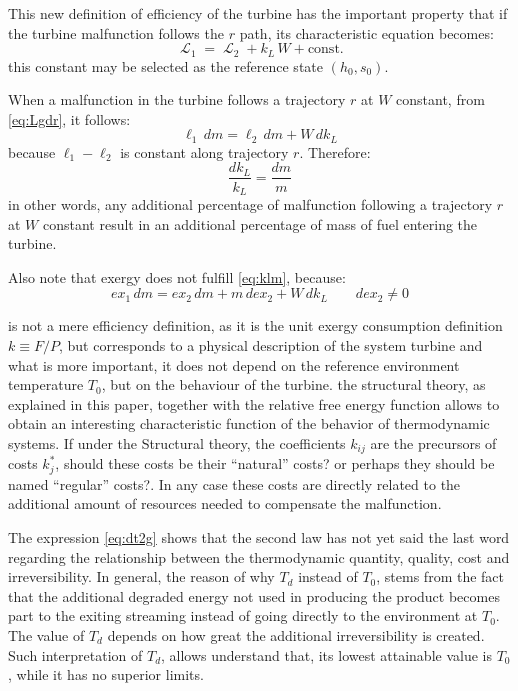 \documentclass[energies,article,submit,moreauthors,pdftex]{Definitions/mdpi}
\DeclareMathOperator{\Lgdr}{\mathcal{L}}
\begin{document}
This new definition of efficiency of the turbine has the important property that if the turbine malfunction follows the $r$ path, its characteristic equation becomes:
\begin{equation}
\Lgdr_1=\Lgdr_2 + k_L\,W + \text{const}.
\label{eq:Lgdr}
\end{equation}
this constant may be selected as the reference state $(h_0,s_0)$. 

When a malfunction in the turbine follows a trajectory $r$ at $W$ constant, from \cref{eq:Lgdr}, it follows:
\begin{equation}
    \ell_1\, dm = \ell_2\, dm + W\,dk_L
\end{equation}
because $\ell_1-\ell_2$ is constant along trajectory $r$. Therefore:
\begin{equation}
    \frac{dk_L}{k_L}=\frac{dm}{m}
    \label{eq:klm}
\end{equation}
in other words, any additional percentage of malfunction following a trajectory $r$ at $W$ constant result in an additional percentage of mass of fuel entering the turbine.

Also note that exergy does not fulfill \cref{eq:klm}, because:
\[
	ex_1\,dm = ex_2\,dm + m\,dex_2 + W\,dk_L\qquad dex_2\neq0
\]

 is not a mere efficiency definition, as it is the unit exergy consumption definition $k\equiv F/P$, but corresponds to a physical description of the system turbine and what is more important, it does not depend on the reference environment temperature $T_0$, but on the behaviour of the turbine. the structural theory, as explained in this paper, together with the relative free energy function allows to obtain an interesting characteristic function of the behavior of thermodynamic systems. If under the Structural theory, the coefficients $k_{ij}$ are the precursors of costs $k_j^*$, should these costs be their “natural” costs? or perhaps they should be named “regular” costs?. In any case these costs are directly related to the  additional amount of resources needed to compensate the malfunction.

The expression \cref{eq:dt2g} shows that the second law has not yet said the last word regarding the relationship between the thermodynamic quantity, quality, cost and irreversibility. In general, the reason of why $T_d$ instead of $T_0$, stems from the fact that the additional degraded energy not used in producing the product becomes part to the exiting streaming instead of going directly to the environment at $T_0$.  The value of $T_d$ depends on how great the additional irreversibility is created. Such interpretation of $T_d$, allows understand that, its lowest attainable value is $T_0$, while it has no superior limits.
\end{document}
